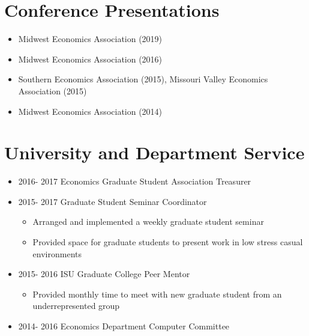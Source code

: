 \documentclass[letterpaper]{article}
\begin{document}
\section*{Conference Presentations}


\begin{itemize}
\item Midwest Economics Association (2019)
\item Midwest Economics Association (2016)
\item Southern Economics Association (2015), Missouri Valley Economics Association (2015)
\item Midwest Economics Association (2014)
\end{itemize}

\section*{University and Department Service}

\begin{itemize}
\item 2016- 2017 Economics Graduate Student Association Treasurer
\item 2015- 2017 Graduate Student Seminar Coordinator
\begin{itemize}
\item Arranged and implemented a weekly graduate student seminar
\item Provided space for graduate students to present work in low stress casual environments
  \end{itemize}
\item 2015- 2016 ISU Graduate College Peer Mentor
\begin{itemize}
\item Provided monthly time to meet with new graduate student from an underrepresented group
\end{itemize}
\item 2014- 2016 Economics Department Computer Committee
\end{itemize}
\end{document}
